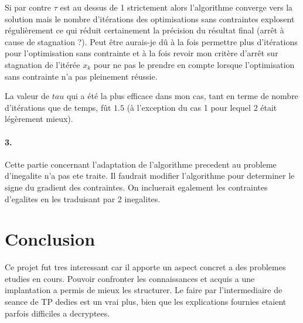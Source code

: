 \documentclass[12pt]{article}
\begin{document}
Si par contre $\tau$ est au dessus de 1 strictement alors l'algorithme converge vers la solution mais le nombre d'itérations des optimisations sans contraintes explosent régulièrement ce qui réduit certainement la précision du résultat final (arrêt à cause de stagnation ?).
Peut être aurais-je dû à la fois permettre plus d'itérations pour l'optimisation sans contrainte et à la fois revoir mon critère d'arrêt sur stagnation de l'itérée $x_k$ pour ne pas le prendre en compte lorsque l'optimisation sans contrainte n'a pas pleinement réussie.

La valeur de $tau$ qui a été la plus efficace dans mon cas, tant en terme de nombre d'itérations que de temps, fût $1.5$ (à l'exception du cas 1 pour lequel $2$ était légèrement mieux).

\paragraph{3.}
Cette partie concernant l'adaptation de l'algorithme precedent au probleme d'inegalite n'a pas ete traite. Il faudrait modifier l'algorithme pour determiner le signe du gradient des contraintes. On incluerait egalement les contraintes d'egalites en les traduisant par 2 inegalites.

\newpage
\section*{Conclusion}
Ce projet fut tres interessant car il apporte un aspect concret a des problemes etudies en cours. Pouvoir confronter les connaissances et acquis a une implantation a permis de mieux les structurer.\newline
Le faire par l'intermediaire de seance de TP dedies est un vrai plus, bien que les explications fournies etaient parfois difficiles a decryptees.
\end{document}
